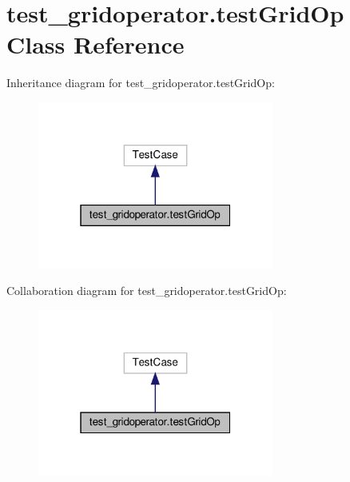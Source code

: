 \hypertarget{classtest__gridoperator_1_1testGridOp}{}\section{test\+\_\+gridoperator.\+test\+Grid\+Op Class Reference}
\label{classtest__gridoperator_1_1testGridOp}


Inheritance diagram for test\+\_\+gridoperator.\+test\+Grid\+Op\+:
\nopagebreak
\begin{figure}[H]
\begin{center}
\leavevmode
\includegraphics[width=220pt]{classtest__gridoperator_1_1testGridOp__inherit__graph}
\end{center}
\end{figure}


Collaboration diagram for test\+\_\+gridoperator.\+test\+Grid\+Op\+:
\nopagebreak
\begin{figure}[H]
\begin{center}
\leavevmode
\includegraphics[width=220pt]{classtest__gridoperator_1_1testGridOp__coll__graph}
\end{center}
\end{figure}
